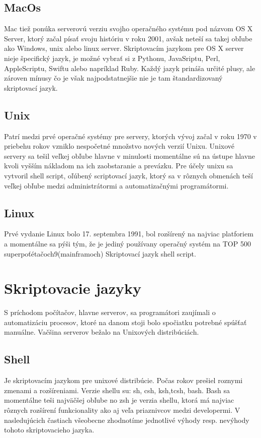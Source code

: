 \subsection{MacOs}
\indent  Mac tiež ponúka serverovú verziu svojho operačného systému pod názvom OS X Server, ktorý začal písať svoju históriu v roku 2001, avšak neteší sa takej obľube ako Windows, unix alebo linux server. Skriptovacím jazykom pre OS X server nieje špecifický jazyk, je možné vybrať si z Pythonu, JavaSriptu, Perl, AppleScriptu, Swiftu alebo napríklad Ruby. Každý jazyk prináša určité plusy, ale zároven mínusy čo je však najpodstatnejšie nie je tam štandardizovaný skriptovací jazyk.
\newline
\subsection{Unix}
\indent Patrí medzi prvé operačné systémy pre servery, ktorých vývoj začal v roku 1970 v priebehu rokov vzniklo nespočetné množstvo nových verzií Unixu. Unixové servery sa tešil veľkej obľube hlavne v minulosti momentálne sú na ústupe hlavne kvoli vyšším nákladom na ich zaobstaranie a prevázku. Pre účely unixu sa vytvoril shell script, oľúbený scriptovací jazyk, ktorý sa v rôznych obmenách teší veľkej obľube medzi administrátormi a automatizačnými programátormi.
\newline
\subsection{Linux}
\indent  Prvé vydanie Linux  bolo 17. septembra 1991, bol rozšírený na najviac platforiem a momentálne sa pýši tým, že je jediný používany operačný systém na TOP 500 superpoťétačoch9(mainframoch) Skriptovací jazyk shell script.
\newline
\section{ Skriptovacie jazyky}
\indent S príchodom počítačov, hlavne serverov, sa programátori zaujímali o automatizáciu procesov, ktoré na danom stoji bolo spočiatku potrebné spúšťať manuálne.
Vačšina serverov bežalo na Unixových distribúciách.

\subsection{Shell}
\indent
Je skriptovacím jazykom pre unixové distribúcie. Počas rokov prešiel roznymi zmenami a rozšíreniami. Verzie shellu su: sh, csh, ksh,tcsh, bash. Bash sa momentálne teši najväčšej obľube no zsh je verzia shellu, ktorá má najviac rôznych rozšírení funkcionality ako aj veľa priaznivcov medzi developermi. V nasledujúcich častiach všeobecne zhodnotíme jednotlivé výhody resp. nevýhody tohoto skriptovacieho jazyka.

